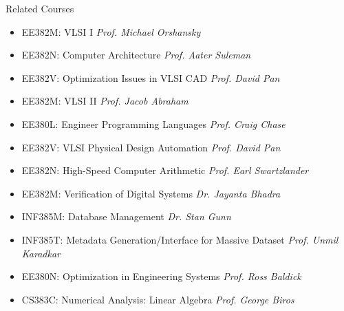 
\begin{rSection}{Related Courses}

\begin{itemize}
\item EE382M:  VLSI  I  \hfill{\em Prof.  Michael  Orshansky}
\item EE382N:  Computer  Architecture  \hfill{\em Prof.  Aater  Suleman} 
\item EE382V:  Optimization  Issues  in  VLSI  CAD  \hfill{\em Prof.  David  Pan}
\item EE382M:  VLSI  II  \hfill{\em Prof.  Jacob  Abraham}
\item EE380L:  Engineer  Programming  Languages  \hfill{\em Prof.  Craig  Chase}
\item EE382V:  VLSI  Physical  Design  Automation  \hfill{\em Prof.  David  Pan} 
\item EE382N:  High-Speed Computer Arithmetic \hfill{\em Prof. Earl Swartzlander}
\item EE382M:  Verification of Digital Systems \hfill{\em Dr. Jayanta Bhadra} 
\item INF385M:  Database Management \hfill{\em Dr. Stan Gunn}
\item INF385T:  Metadata Generation/Interface for Massive Dataset \hfill{\em Prof. Unmil Karadkar}
\item EE380N:  Optimization in Engineering Systems  \hfill{\em Prof. Ross Baldick}
\item CS383C:  Numerical Analysis: Linear Algebra  \hfill{\em Prof. George Biros}
\end{itemize}

\end{rSection}

